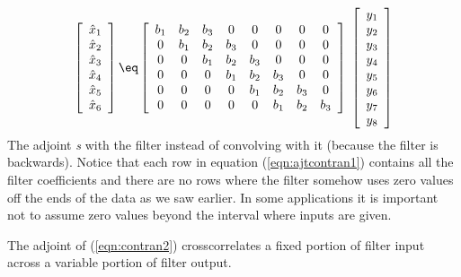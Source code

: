 \begin{equation}
\left[ 
\begin{array}{c}
\hat  x_1 \\ 
\hat  x_2 \\ 
\hat  x_3 \\ 
\hat  x_4 \\ 
\hat  x_5 \\ 
\hat  x_6
  \end{array} \right] 
\eq
\left[ 
\begin{array}{cccccccc}
  b_1 & b_2 & b_3 & 0   & 0   & 0   & 0   & 0  \\
  0   & b_1 & b_2 & b_3 & 0   & 0   & 0   & 0  \\
  0   & 0   & b_1 & b_2 & b_3 & 0   & 0   & 0  \\
  0   & 0   & 0   & b_1 & b_2 & b_3 & 0   & 0  \\
  0   & 0   & 0   & 0   & b_1 & b_2 & b_3 & 0  \\
  0   & 0   & 0   & 0   & 0   & b_1 & b_2 & b_3 
  \end{array} \right] 
\; \left[ 
\begin{array}{c}
  y_1 \\ 
  y_2 \\ 
  y_3 \\ 
  y_4 \\ 
  y_5 \\ 
  y_6 \\ 
  y_7 \\ 
  y_8 \end{array} \right]
\label{eqn:ajtcontran1}
\end{equation}
The adjoint {\em  {}s} with the filter
instead of convolving with it (because the filter is backwards).
Notice that each row in
equation (\ref{eqn:ajtcontran1}) contains all the filter coefficients
and there are no rows where the filter somehow uses zero values
off the ends of the data as we saw earlier.
In some applications it is important not to assume zero values
beyond the interval where inputs are given.
\par
The adjoint of (\ref{eqn:contran2}) crosscorrelates a fixed portion
of filter input across a variable portion of filter output.
